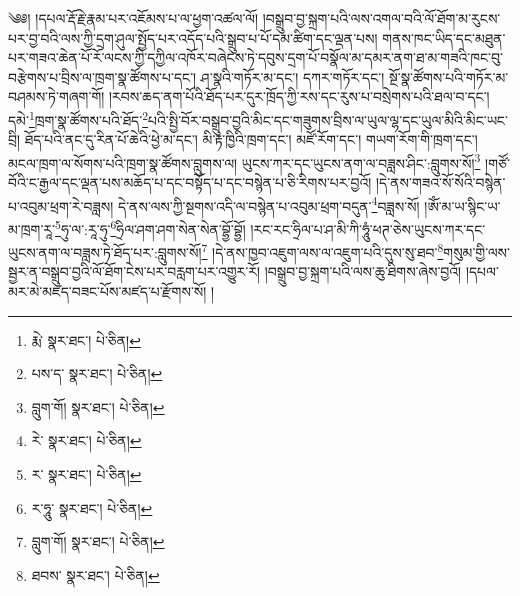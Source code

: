 \setcounter{footnote}{0} 
༄༅། །དཔལ་རྡོ་རྗེ་རྣམ་པར་འཇོམས་པ་ལ་ཕྱག་འཚལ་ལོ། །བསྒྲུབ་བྱ་སྐྲག་པའི་ལས་འགལ་བའི་ལོ་ཐོག་མ་རུངས་པར་བྱ་བའི་ལས་ཀྱི་དྲག་ཤུལ་སྤྱོད་པར་འདོད་པའི་སྒྲུབ་པ་པོ་དམ་ཚིག་དང་ལྡན་པས། གནས་ཁང་ཡིད་དང་མཐུན་པར་གཟའ་ཆེན་པོ་རོ་ལངས་ཀྱི་དཀྱིལ་འཁོར་བཞེངས་ཏེ་དབུས་དྲག་པོ་བསྣོལ་མ་དམར་ནག་ཐ་མ་གཟའི་ཁང་བུ་བརྩེགས་པ་བྲིས་ལ་ཁྲག་སྣ་ཚོགས་པ་དང་། ཤ་སྣའི་གཏོར་མ་དང་། དཀར་གཏོར་དང་། སྔོ་སྣ་ཚོགས་པའི་གཏོར་མ་བཤམས་ཏེ་གཞག་གོ། །རབས་ཆད་ནག་པོའི་ཐོད་པར་དུར་ཁྲོད་ཀྱི་རས་དང་རུས་པ་བསྲེགས་པའི་ཐལ་བ་དང་། དམེ་\footnote{རྨེ་  སྣར་ཐང་།  པེ་ཅིན། }ཁྲག་སྣ་ཚོགས་པའི་ཐོད་\footnote{པས་ད་  སྣར་ཐང་།  པེ་ཅིན། }པའི་སྤྱི་བོར་བསྒྲུབ་བྱའི་མིང་དང་གཟུགས་བྲིས་ལ་ཡུལ་ལྷ་དང་ཡུལ་མིའི་མིང་ཡང་བྲི། ཐོད་པའི་ནང་དུ་རིན་པོ་ཆེའི་ཕྱེ་མ་དང་། མི་རྟ་ཁྱིའི་ཁྲག་དང་། མཛོ་རོག་དང་། གཡག་རོག་གི་ཁྲག་དང་། མངལ་ཁྲག་ལ་སོགས་པའི་ཁྲག་སྣ་ཚོགས་བླུགས་ལ། ཡུངས་ཀར་དང་ཡུངས་ནག་ལ་བཟླས་ཤིང་:བླུགས་སོ།\footnote{བླུག་གོ།  སྣར་ཐང་།  པེ་ཅིན། } །གཙོ་བོའི་ང་རྒྱལ་དང་ལྡན་པས་མཆོད་པ་དང་བསྟོད་པ་དང་བསྙེན་པ་ཅི་རིགས་པར་བྱའོ། །དེ་ནས་གཟའ་སོ་སོའི་བསྙེན་པ་འབུམ་ཕྲག་རེ་བཟླས། དེ་ནས་ལས་ཀྱི་སྔགས་འདི་ལ་བསྙེན་པ་འབུམ་ཕྲག་བདུན་\footnote{རེ་  སྣར་ཐང་།  པེ་ཅིན། }བཟླས་སོ། །ཨོཾ་མ་ཡ་སྙིང་ཡ་མ་ཁྲག་རཱ་\footnote{ར་  སྣར་ཐང་།  པེ་ཅིན། }ཧུ་ལ་:རཱ་ཧུ་\footnote{ར་ཧཱུ་  སྣར་ཐང་།  པེ་ཅིན། }ཧྲིལ་ཤག་ཤག་སེན་སེན་བྷྱོ་བྷྱོ། །རང་རང་ཧྲིལ་པ་ཤ་མི་ཀི་ཧཱུཾ་ཕཊ་ཅེས་ཡུངས་ཀར་དང་ཡུངས་ནག་ལ་བཟླས་ཏེ་ཐོད་པར་:བླུགས་སོ།\footnote{བླུག་གོ།  སྣར་ཐང་།  པེ་ཅིན། } །དེ་ནས་ཁྱབ་འཇུག་ལས་ལ་འཇུག་པའི་དུས་སུ་ཐབ་\footnote{ཐབས་  སྣར་ཐང་།  པེ་ཅིན། }གསུམ་གྱི་ལས་སྦྱར་ན་བསྒྲུབ་བྱའི་ལོ་ཐོག་ངེས་པར་བརླག་པར་འགྱུར་རོ། །བསྒྲུབ་བྱ་སྐྲག་པའི་ལས་ཆུ་ཐིགས་ཞེས་བྱའོ། །དཔལ་མར་མེ་མཛད་བཟང་པོས་མཛད་པ་རྫོགས་སོ། ། 
